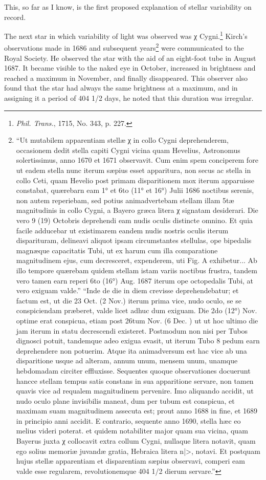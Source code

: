 \documentclass[a4paper, 12pt, oneside, polutonikogreek, english]{article}
\begin{document}
This, so far as I know, is the first proposed explanation of stellar variability on record.

The next star in which variability of light was observed was χ Cygni.\footnote{\emph{Phil. Trans.}, 1715, No. 343, p. 227.} Kirch's observations made in 1686 and subsequent years\footnote{``Ut mutabilem apparentiam stellæ χ in collo Cygni deprehenderem, occasionem dedit stella capiti Cygni vicina quam Hevelius, Astronomus solertissimus, anno 1670 et 1671 observavit. Cum enim spem conciperem fore ut eadem stella nunc iterum sæpius esset apparitura, non secus ac stella in collo Ceti, quam Hevelio post primam disparitionem mox iterum apparuisse constabat, quærebarn eam 1° et 6to (11° et 16°) Julii 1686 noctibus serenis, non autem reperiebam, sed potius animadvertebam stellam illam 5tæ magnitudinis in collo Cygni, a Bayero græca litera χ signatam desiderari. Die vero 9 (19) Octobris deprehendi eam nudis oculis distincte omnino. Et quia facile adducebar ut existimarem eandem nudis nostris oculis iterum disparituram, delineavi aliquot ipsam circumstantes stellulas, ope bipedalis magnæque capacitatis Tubi, ut ex harum cum illa comparatione magnitudinem ejus, cum decresceret, expenderem, uti Fig. A exhibetur... Ab illo tempore quærebam quidem stellam istam variis noctibus frustra, tandem vero tamen earn reperi 6to (16°) Aug. 1687 iterum ope octopedalis Tubi, at vero exiguam valde.'' ``Inde de die in diem crevisse deprehendebatur; et factum est, ut die 23 Oct. (2 Nov.) iterum prima vice, nudo oculo, se se conspiciendam præberet, valde licet adhuc dum exiguam. Die 2do (12°) Nov. optime erat conspicua, etiam post 26tum Nov. (6 Dec. ) ut ut hoc ultimo die jam iterum in statu decrescendi existeret. Postmodum non nisi per Tubos dignosci potuit, tandemque adeo exigua evasit, ut iterum Tubo 8 pedum earn deprehendere non potuerim. Atque ita animadversum est hac vice ab una disparitione usque ad alteram, annum unum, mensem unum, unamque hebdomadam circiter effluxisse. Sequentes quoque observationes docuerunt hancce stellam tempus satis constans in sua apparitione servare, non tamen quavis vice ad requalem magnitudinem pervenire. Imo aliquando accidit, ut nudo oculo plane invisibilis maneat, dum per tubum est conspicua, et maximam suam magnitudinem assecuta est; prout anno 1688 in fine, et 1689 in principio anni accidit. E contrario, sequente anno 1690, stella hæc eo melius videri poterat. et quidem notabiliter major quam sua vicina, quam Bayerus juxta χ collocavit extra collum Cygni, nullaque litera notavit, quam ego solius memoriæ juvandæ gratia, Hebraica litera \<n|>, notavi. Et postquam hujus stellæ apparentiam et disparentiam sæpius observavi, comperi eam valde esse regularem, revolutionemque 404 1/2 dierum servare.''} were communicated to the Royal Society. He observed the star with the aid of an eight-foot tube in August 1687. It became visible to the naked eye in October, increased in brightness and reached a maximum in November, and finally disappeared. This observer also found that the star had always the same brightness at a maximum, and in assigning it a period of 404 1/2 days, he noted that this duration was irregular.
\end{document}
